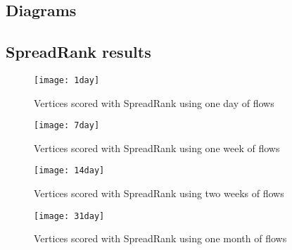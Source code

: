 \begin{landscape}
\chapter{Diagrams}
\section{SpreadRank results}
\begin{figure}[h!]
	\caption{Vertices scored with SpreadRank using one day of flows}
	\label{fig:1day}
	\centering
		\texttt{[image: 1day]}
\end{figure}
\begin{figure}[h!]
	\caption{Vertices scored with SpreadRank using one week of flows}
	\label{fig:7day}
	\centering
		\texttt{[image: 7day]}
\end{figure}
\begin{figure}[h!]
	\caption{Vertices scored with SpreadRank using two weeks of flows}
	\label{fig:14day}
	\centering
		\texttt{[image: 14day]}
\end{figure}
\begin{figure}[h!]
	\caption{Vertices scored with SpreadRank using one month of flows}
	\label{fig:31day}
	\centering
		\texttt{[image: 31day]}
\end{figure}
\end{landscape}
